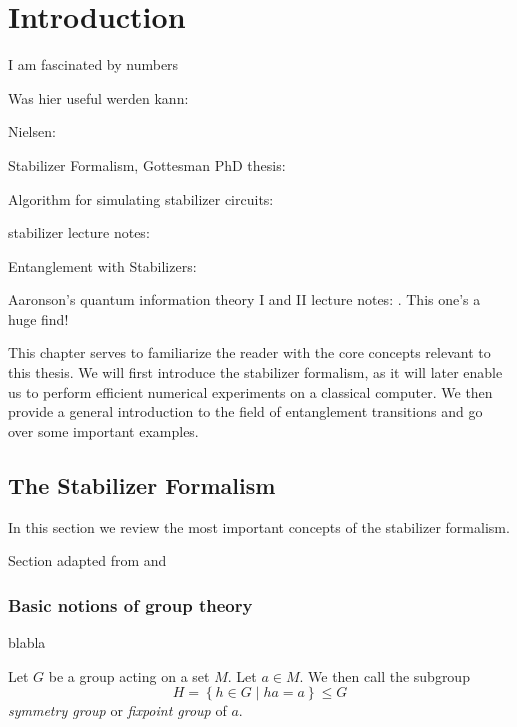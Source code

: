 \chapter{Introduction}
\label{ch:basics}
\epigraph{I am fascinated by numbers}{
\citeauthor{baron-cohenAutismSpectrumQuotientAQ2001}}

Was hier useful werden kann:

Nielsen: \cite{nielsenQuantumComputationQuantum2010}

Stabilizer Formalism, Gottesman PhD thesis: \cite{gottesmanStabilizerCodesQuantum1997}

Algorithm for simulating stabilizer circuits:
\cite{aaronsonImprovedSimulationStabilizer2004}

stabilizer lecture notes: \cite{arabLectureNotesQuantum2024}

Entanglement with Stabilizers: \cite{fattalEntanglementStabilizerFormalism2004}

Aaronson's quantum information theory I and II lecture notes:
\cite{aaronsonIntroductionQuantumInformation,aaronsonIntroductionQuantumInformationa}.
This one's a huge find!

This chapter serves to familiarize the reader with the core concepts relevant
to this thesis. We will first introduce the stabilizer formalism, as it will
later enable us to perform efficient numerical experiments on a classical
computer. We then provide a general introduction to the field of entanglement
transitions and go over some important examples. 
\section{The Stabilizer Formalism}\label{sec:stab-basics}
In this section we review the most important concepts of the stabilizer
formalism. 

Section adapted from \cite{nielsenQuantumComputationQuantum2010} and
\cite{gottesmanStabilizerCodesQuantum1997}
\subsection{Basic notions of group theory}
blabla

\begin{defn}\label{defn:fixpointgroup}
  Let $G$ be a group acting on a set $M$. Let $a\in M$. We then call the
  subgroup
  \[ H = \left\{ h \in G \mid ha = a \right\} \leq G \]
  \emph{symmetry group} or \emph{fixpoint group} of $a$.
\end{defn}


